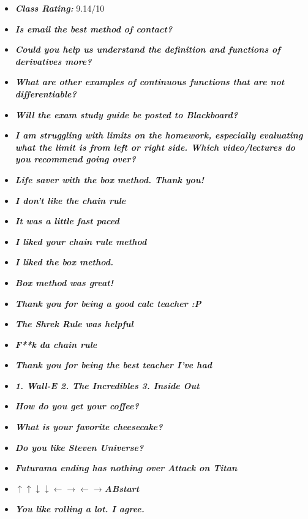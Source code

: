 \documentclass[11pt,letterpaper]{article}
\begin{document}
\begin{itemize}
\item {\bfseries\itshape Class Rating:} 9.14/10
\item {\bfseries\itshape Is email the best method of contact?}
\item {\bfseries\itshape Could you help us understand the definition and functions of derivatives more?}
\item {\bfseries\itshape What are other examples of continuous functions that are not differentiable?} 
\item {\bfseries\itshape Will the exam study guide be posted to Blackboard?}
\item {\bfseries\itshape I am struggling with limits on the homework, especially evaluating what the limit is from left or right side. Which video/lectures do you recommend going over?}
\item {\bfseries\itshape Life saver with the box method. Thank you!}
\item {\bfseries\itshape I don't like the chain rule}
\item {\bfseries\itshape It was a little fast paced}
\item {\bfseries\itshape I liked your chain rule method}
\item {\bfseries\itshape I liked the box method.}
\item {\bfseries\itshape Box method was great!}
\item {\bfseries\itshape Thank you for being a good calc teacher :P }
\item {\bfseries\itshape The Shrek Rule was helpful}
\item {\bfseries\itshape F**k da chain rule}
\item {\bfseries\itshape Thank you for being the best teacher I've had}
\item {\bfseries\itshape 1. Wall-E 2. The Incredibles 3. Inside Out} 
\item {\bfseries\itshape How do you get your coffee?} 
\item {\bfseries\itshape What is your favorite cheesecake?}
\item {\bfseries\itshape Do you like Steven Universe?}
\item {\bfseries\itshape Futurama ending has nothing over Attack on Titan}
\item {\bfseries\itshape $\uparrow\uparrow\downarrow\downarrow\leftarrow\rightarrow\leftarrow\rightarrow$ABstart}
\item {\bfseries\itshape You like rolling a lot. I agree.}

\end{itemize}
\end{document}
